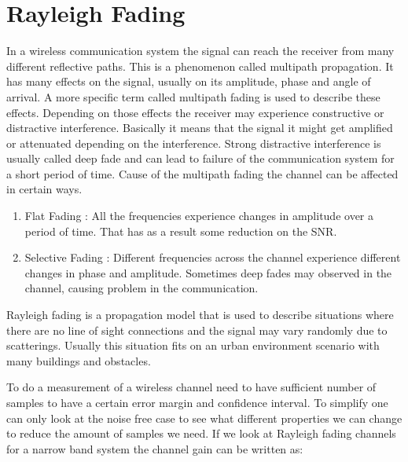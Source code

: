 \section{Rayleigh Fading}


In a wireless communication system the signal can reach the receiver from many different reflective paths. This is a phenomenon called multipath propagation. It has many effects on the signal, usually on its amplitude, phase and angle of arrival.\citep{Fading} A more specific term called multipath fading is used to describe these effects. Depending on those effects the receiver may experience constructive or distractive interference. Basically it means that the signal it might get amplified or attenuated depending on the interference. Strong distractive interference is usually called deep fade and can lead to failure of the communication system for a short period of time. Cause of the multipath fading the channel can be affected in certain ways.
	\begin{enumerate}
	\item Flat Fading : All the frequencies experience changes in amplitude over a period of time. That has as a result some reduction on the SNR.
	\item Selective Fading : Different frequencies across the channel experience different changes in phase and amplitude. Sometimes deep fades may observed in the channel, causing problem in the communication.\citep{FlatSelective}
	\end{enumerate}
Rayleigh fading is a propagation model that is used to describe situations where there are no line of sight connections and the signal may vary randomly due to scatterings. Usually this situation fits on an urban environment scenario with many buildings and obstacles.

To do a measurement of a wireless channel need to have sufficient number of samples to have a certain error margin and confidence interval. To simplify one can only look at  the noise free case to see what different properties we can change to reduce the amount of samples we need. 
If we look at Rayleigh fading channels for a narrow band system the channel gain can be written as:


